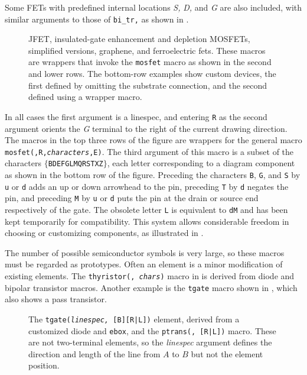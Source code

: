 \pagebreak
Some FETs with predefined internal locations {\sl S,} {\sl D,} and {\sl G} are
also included, with similar arguments to those of {\tt bi\_tr,} as shown in
.
\begin{figure}[H]
\vspace*{-\baselineskip}
   
   \caption{JFET, insulated-gate enhancement and depletion MOSFETs,
     simplified versions, graphene, and ferroelectric fets. 
     These macros are wrappers that invoke the {\tt mosfet}
     macro as shown in the second and lower rows.
     The bottom-row examples show custom devices, the first
     defined by omitting the substrate connection, and the second
     defined using a wrapper macro.}
   \label{fet}
   \end{figure}
In all cases the first argument is a linespec,
and entering
{\tt R} as the second argument orients the {\sl G} terminal to the right of the
current drawing direction.
The macros in the top three rows of the figure are wrappers for the
general macro {\tt mosfet(\linespec,R,{\sl characters},E)}.
The third argument of this macro is a subset of the characters
$\{${\tt BDEFGLMQRSTXZ}$\}$, each letter corresponding to
a diagram component as shown in the bottom row of the figure. 
Preceding the characters {\tt B}, {\tt G}, and {\tt S} by {\tt u} or {\tt d}
adds an up or down arrowhead to the pin, preceding {\tt T} by {\tt d}
negates the pin, and preceding {\tt M} by {\tt u} or {\tt d} puts the pin
at the drain or source end respectively of the gate.
The obsolete letter {\tt L} is equivalent to {\tt dM} and has been kept
temporarily for compatibility.
This system allows considerable freedom in choosing or customizing components,
as illustrated in .

The number of possible semiconductor symbols is very
large, so these macros must be regarded as prototypes.
Often an element is a minor modification of existing elements.
The {\tt thyristor(\linespec, {\sl chars})} macro in
 is derived from diode and bipolar transistor macros.
Another example is the {\tt tgate} macro shown in , which
also shows a pass transistor.
\begin{figure}[H]
   
   \caption{The {\tt tgate({\sl linespec,} [B][R|L])} element, derived from
     a customized diode and {\tt ebox}, and the
     {\tt ptrans(\linespec, [R|L])} macro.
     These are not two-terminal elements, so the {\sl linespec} argument
     defines the direction and length of the line from $A$ to $B$ but not
     the element position.}
   \label{Tgate}
   \end{figure}

